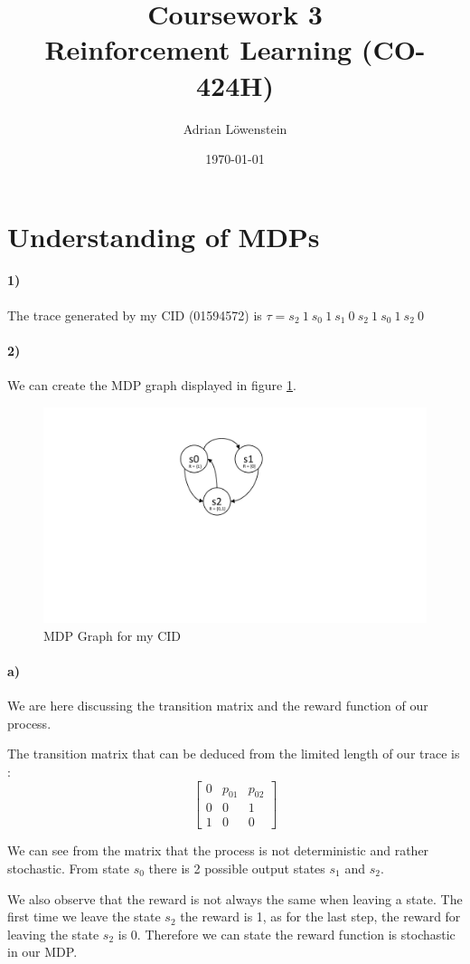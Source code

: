 \documentclass[11pt,a4paper]{article}
\title{Coursework 3 \\
Reinforcement Learning (CO-424H)}							%
\author{Adrian Löwenstein}								%
\date{\today}											%
\numberwithin{equation}{section}
\begin{document}
\maketitle

\section{Understanding of MDPs}
\paragraph{1)}
The trace generated by my CID (01594572) is $ \tau =  s_2 \ 1 \ s_0 \ 1 \ s_1 \ 0 \ s_2 \ 1 \ s_0 \ 1 \ s_2 \ 0 $
\paragraph{2)}
We can create the MDP graph displayed in figure \ref{CID}.
\begin{figure}[H]
	\centering
	\includegraphics[width = 0.3\linewidth]{CID_graph}
	\caption{MDP Graph for my CID}
	\label{CID}
\end{figure}
\paragraph{a)} We are here discussing the transition matrix and the reward function of our process. 

The transition matrix that can be deduced from the limited length of our trace is :
\begin{equation}
	\begin{bmatrix}
		0 & p_{01} & p_{02} \\
		0 & 0 & 1 \\
		1 & 0 & 0 
	\end{bmatrix}
\end{equation}

We can see from the matrix that the process is not deterministic and rather stochastic. From state $s_0$ there is 2 possible output states $s_1$ and $s_2$. 


We also observe that the reward is not always the same when leaving a state. The first time we leave the state $s_2$ the reward is 1, as for the last step, the reward for leaving the state $s_2$ is 0. Therefore we can state the reward function is stochastic in our MDP.
\end{document}
